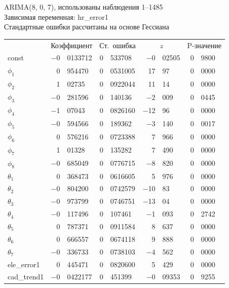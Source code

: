 \documentclass[a4paper,12pt]{article}
\begin{document}
\begin{table}[H]
\begin{center}
	
	ARIMA(8, 0, 7), использованы наблюдения 1--1485\\
	Зависимая переменная: hr\_error1\\
	Стандартные ошибки рассчитаны на основе Гессиана
	
	\vspace{1em}
	
	\begin{tabular}{lr@{,}lr@{,}lr@{,}lr@{,}l}
		&
		\multicolumn{2}{c}{Коэффициент} &
		\multicolumn{2}{c}{Ст.\ ошибка} &
		\multicolumn{2}{c}{$z$} &
		\multicolumn{2}{c}{P-значение} \\[1ex]
		const &
		$-$0&0133712 &
		0&533708 &
		$-$0&02505 &
		0&9800 \\
		$\phi_{1}$ &
		0&954470 &
		0&0531005 &
		17&97 &
		0&0000 \\
		$\phi_{2}$ &
		1&02735 &
		0&0922044 &
		11&14 &
		0&0000 \\
		$\phi_{3}$ &
		$-$0&281596 &
		0&140136 &
		$-$2&009 &
		0&0445 \\
		$\phi_{4}$ &
		$-$1&07043 &
		0&0826160 &
		$-$12&96 &
		0&0000 \\
		$\phi_{5}$ &
		$-$0&594566 &
		0&189362 &
		$-$3&140 &
		0&0017 \\
		$\phi_{6}$ &
		0&576216 &
		0&0723388 &
		7&966 &
		0&0000 \\
		$\phi_{7}$ &
		1&01328 &
		0&135282 &
		7&490 &
		0&0000 \\
		$\phi_{8}$ &
		$-$0&685049 &
		0&0776715 &
		$-$8&820 &
		0&0000 \\
		$\theta_{1}$ &
		0&368473 &
		0&0616605 &
		5&976 &
		0&0000 \\
		$\theta_{2}$ &
		$-$0&804200 &
		0&0742579 &
		$-$10&83 &
		0&0000 \\
		$\theta_{3}$ &
		$-$0&973799 &
		0&0746751 &
		$-$13&04 &
		0&0000 \\
		$\theta_{4}$ &
		$-$0&117496 &
		0&107461 &
		$-$1&093 &
		0&2742 \\
		$\theta_{5}$ &
		0&787371 &
		0&0911584 &
		8&637 &
		0&0000 \\
		$\theta_{6}$ &
		0&666557 &
		0&0674118 &
		9&888 &
		0&0000 \\
		$\theta_{7}$ &
		$-$0&336733 &
		0&0738103 &
		$-$4&562 &
		0&0000 \\
		ele\_error1 &
		0&445471 &
		0&0820600 &
		5&429 &
		0&0000 \\
		cad\_trend1 &
		$-$0&0422177 &
		0&451399 &
		$-$0&09353 &
		0&9255 \\
	\end{tabular}
	

\end{center}
\end{table}
\end{document}
